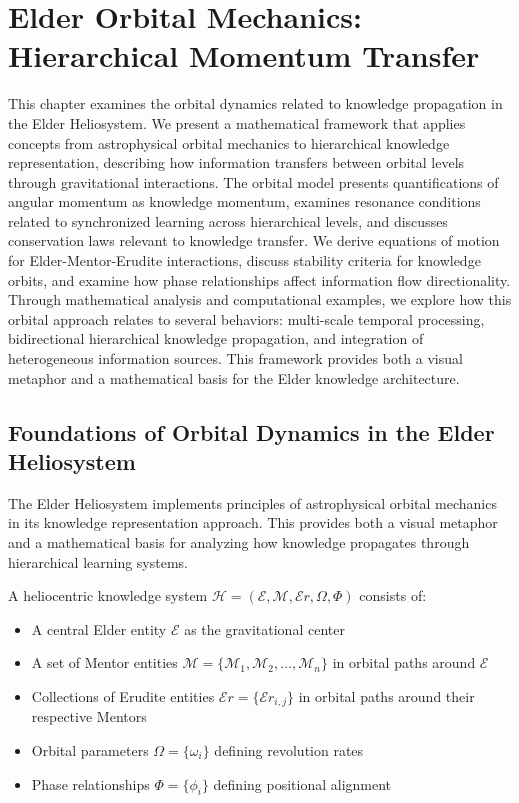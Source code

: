 \chapter{Elder Orbital Mechanics: Hierarchical Momentum Transfer}

\begin{tcolorbox}[colback=blue!5!white,colframe=blue!75!black,title=Chapter Summary]
This chapter examines the orbital dynamics related to knowledge propagation in the Elder Heliosystem. We present a mathematical framework that applies concepts from astrophysical orbital mechanics to hierarchical knowledge representation, describing how information transfers between orbital levels through gravitational interactions. The orbital model presents quantifications of angular momentum as knowledge momentum, examines resonance conditions related to synchronized learning across hierarchical levels, and discusses conservation laws relevant to knowledge transfer. We derive equations of motion for Elder-Mentor-Erudite interactions, discuss stability criteria for knowledge orbits, and examine how phase relationships affect information flow directionality. Through mathematical analysis and computational examples, we explore how this orbital approach relates to several behaviors: multi-scale temporal processing, bidirectional hierarchical knowledge propagation, and integration of heterogeneous information sources. This framework provides both a visual metaphor and a mathematical basis for the Elder knowledge architecture.
\end{tcolorbox}

\section{Foundations of Orbital Dynamics in the Elder Heliosystem}

The Elder Heliosystem implements principles of astrophysical orbital mechanics in its knowledge representation approach. This provides both a visual metaphor and a mathematical basis for analyzing how knowledge propagates through hierarchical learning systems.

\begin{definition}
A heliocentric knowledge system $\mathcal{H} = (\mathcal{E}, \mathcal{M}, \mathcal{E}r, \Omega, \Phi)$ consists of:
\begin{itemize}
    \item A central Elder entity $\mathcal{E}$ as the gravitational center
    \item A set of Mentor entities $\mathcal{M} = \{\mathcal{M}_1, \mathcal{M}_2, \ldots, \mathcal{M}_n\}$ in orbital paths around $\mathcal{E}$
    \item Collections of Erudite entities $\mathcal{E}r = \{\mathcal{E}r_{i,j}\}$ in orbital paths around their respective Mentors
    \item Orbital parameters $\Omega = \{\omega_i\}$ defining revolution rates
    \item Phase relationships $\Phi = \{\phi_i\}$ defining positional alignment
\end{itemize}
\end{definition}

